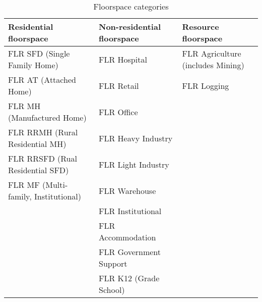 \begin{table}
\centering
\caption{Floorspace categories}\label{tab:floorspace-categories}
\fontsize{11.0}{13.75}\rm
\begin{tabular}{|l|l|l|}
\hline
Residential floorspace & Non-residential floorspace & Resource floorspace \\
\hline
FLR SFD (Single Family Home) & FLR Hospital & FLR Agriculture (includes Mining) \\
FLR AT (Attached Home) & FLR Retail & FLR Logging \\
FLR MH (Manufactured Home) & FLR Office & \\
FLR RRMH (Rural Residential MH) & FLR Heavy Industry & \\
FLR RRSFD (Rual Residential SFD) & FLR Light Industry & \\
FLR MF (Multi-family, Institutional) & FLR Warehouse & \\
 & FLR Institutional &  \\
 & FLR Accommodation & \\
 & FLR Government Support & \\
 & FLR K12 (Grade School) & \\
\hline
\end{tabular}
\end{table}